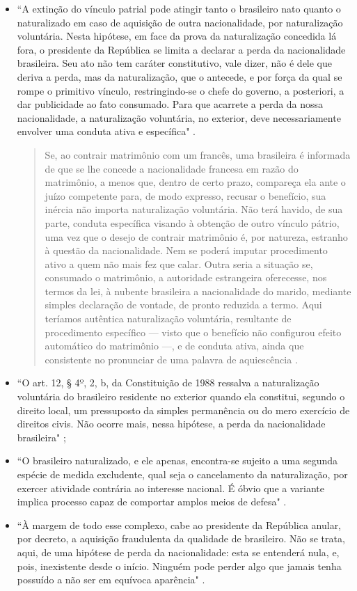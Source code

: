 \documentclass{article}
\begin{document}
\begin{itemize}
    \item ``A extinção do vínculo patrial pode atingir tanto o brasileiro nato quanto o naturalizado em caso de aquisição de outra nacionalidade, por naturalização voluntária. Nesta hipótese, em face da prova da naturalização concedida lá fora, o presidente da República se limita a declarar a perda da nacionalidade brasileira. Seu ato não tem caráter constitutivo, vale dizer, não é dele que deriva a perda, mas da naturalização, que o antecede, e por força da qual se rompe o primitivo vínculo, restringindo-se o chefe do governo, a posteriori, a dar publicidade ao fato consumado. Para que acarrete a perda da nossa nacionalidade, a naturalização voluntária, no exterior, deve necessariamente envolver uma conduta ativa e específica" \cite[p.~83]{rezek_direito_2024}.
    \begin{quote}
        Se, ao contrair matrimônio com um francês, uma brasileira é informada de que se lhe concede a nacionalidade francesa em razão do matrimônio, a menos que, dentro de certo prazo, compareça ela ante o juízo competente para, de modo expresso, recusar o benefício, sua inércia não importa naturalização voluntária. Não terá havido, de sua parte, conduta específica visando à obtenção de outro vínculo pátrio, uma vez que o desejo de contrair matrimônio é, por natureza, estranho à questão da nacionalidade. Nem se poderá imputar procedimento ativo a quem não mais fez que calar. Outra seria a situação se, consumado o matrimônio, a autoridade estrangeira oferecesse, nos termos da lei, à nubente brasileira a nacionalidade do marido, mediante simples declaração de vontade, de pronto reduzida a termo. Aqui teríamos autêntica naturalização voluntária, resultante de procedimento específico — visto que o benefício não configurou efeito automático do matrimônio —, e de conduta ativa, ainda que consistente no pronunciar de uma palavra de aquiescência  \cite[p.~83]{rezek_direito_2024}.
    \end{quote}
    \item ``O art. 12, § 4º, 2, b, da Constituição de 1988 ressalva a naturalização voluntária do brasileiro residente no exterior quando ela constitui, segundo o direito local, um pressuposto da simples permanência ou do mero exercício de direitos civis. Não ocorre mais, nessa hipótese, a perda da nacionalidade brasileira" \cite[p.~83]{rezek_direito_2024};
    \item ``O brasileiro naturalizado, e ele apenas, encontra-se sujeito a uma segunda espécie de medida excludente, qual seja o cancelamento da naturalização, por exercer atividade contrária ao interesse nacional. É óbvio que a variante implica processo capaz de comportar amplos meios de defesa" \cite[p.~83]{rezek_direito_2024}.
    \item ``À margem de todo esse complexo, cabe ao presidente da República anular, por decreto, a aquisição fraudulenta da qualidade de brasileiro. Não se trata, aqui, de uma hipótese de perda da nacionalidade: esta se entenderá nula, e, pois, inexistente desde o início. Ninguém pode perder algo que jamais tenha possuído a não ser em equívoca aparência" \cite[p.~83]{rezek_direito_2024}.
\end{itemize}

\printbibliography
\end{document}
